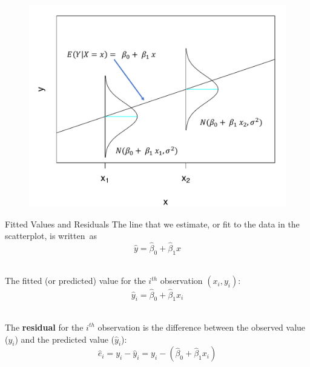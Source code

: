 \documentclass[10pt]{beamer}
\begin{document}
\begin{frame}
\begin{figure}
\includegraphics[scale=0.55]{figure/scatter_norm_annotated.pdf}
\end{figure}
\end{frame}

\begin{frame}{Fitted Values and Residuals}
The line that we estimate, or fit to the data in the scatterplot, is written~as
$$\hat{y} = \hat{\beta}_0 + \hat{\beta}_1 x$$\\
\vspace{10pt}

The fitted (or predicted) value for the $i^{th}$ observation $(x_i, y_i)$:
$$\hat{y}_i = \hat{\beta}_0 + \hat{\beta}_1 x_i$$\\
\vspace{10pt}

The \textbf{residual} for the $i^{th}$ observation is the difference between the observed value ($y_i$) and the predicted value ($\hat{y}_i$):\\
$$\hat{e}_i = y_i - \hat{y}_i = y_i - (\hat{\beta}_0 + \hat{\beta}_1 x_i)$$
\end{frame}
\end{document}
